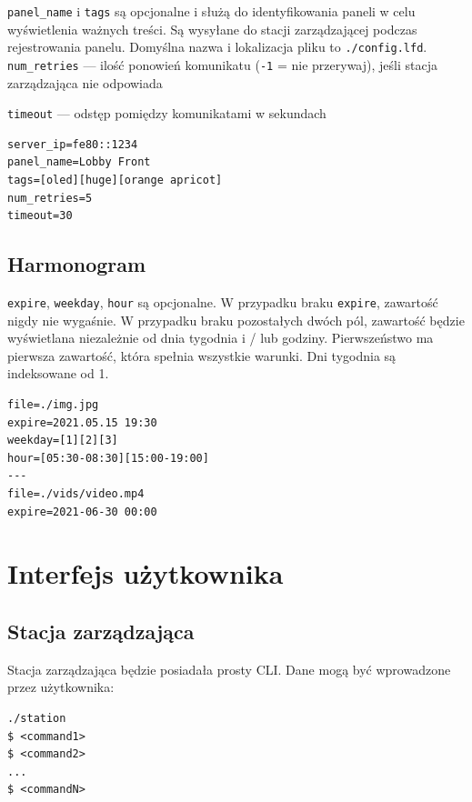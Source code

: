 \documentclass[12pt, a4paper]{article}
\begin{document}
\texttt{panel\_name} i \texttt{tags} są opcjonalne i służą do
identyfikowania paneli w celu wyświetlenia ważnych treści. Są wysyłane
do stacji zarządzającej podczas rejestrowania panelu. Domyślna nazwa i
lokalizacja pliku to \texttt{./config.lfd}.
\\

\texttt{num\_retries} --- ilość ponowień komunikatu (\texttt{-1} = nie przerywaj), jeśli stacja zarządzająca nie odpowiada

\texttt{timeout} --- odstęp pomiędzy komunikatami w sekundach

\begin{verbatim}
server_ip=fe80::1234
panel_name=Lobby Front
tags=[oled][huge][orange apricot]
num_retries=5
timeout=30
\end{verbatim}

\hypertarget{harmonogram}{%
\subsection{Harmonogram}\label{harmonogram}}

\texttt{expire}, \texttt{weekday}, \texttt{hour} są opcjonalne. W
przypadku braku \texttt{expire}, zawartość nigdy nie wygaśnie. W
przypadku braku pozostałych dwóch pól, zawartość będzie wyświetlana
niezależnie od dnia tygodnia i / lub godziny. Pierwszeństwo ma pierwsza
zawartość, która spełnia wszystkie warunki. Dni tygodnia są indeksowane od 1.

\begin{verbatim}
file=./img.jpg
expire=2021.05.15 19:30
weekday=[1][2][3]
hour=[05:30-08:30][15:00-19:00]
---
file=./vids/video.mp4
expire=2021-06-30 00:00
\end{verbatim}

\hypertarget{interfejs-uux17cytkownika}{%
\section{Interfejs użytkownika}\label{interfejs-uux17cytkownika}}

\hypertarget{stacja-zarzux105dzajux105ca}{%
\subsection{Stacja zarządzająca}\label{stacja-zarzux105dzajux105ca}}

Stacja zarządzająca będzie posiadała prosty CLI. Dane mogą być wprowadzone przez użytkownika:

\begin{verbatim}
./station
$ <command1>
$ <command2>
...
$ <commandN>
\end{verbatim}
\end{document}
